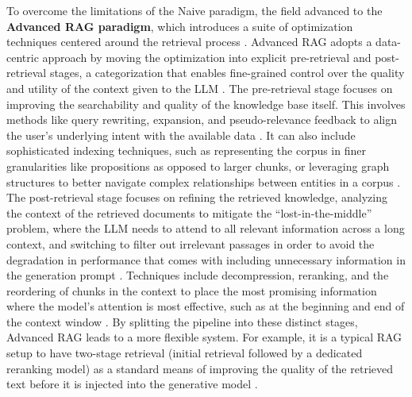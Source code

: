 \documentclass[11pt]{article}
\begin{document}
To overcome the limitations of the Naive paradigm, the field advanced to the \textbf{Advanced RAG paradigm}, which introduces a suite of optimization techniques centered around the retrieval process \cite{ref23,ref38}. Advanced RAG adopts a data-centric approach by moving the optimization into explicit pre-retrieval and post-retrieval stages, a categorization that enables fine-grained control over the quality and utility of the context given to the LLM \cite{ref23}. The pre-retrieval stage focuses on improving the searchability and quality of the knowledge base itself. This involves methods like query rewriting, expansion, and pseudo-relevance feedback to align the user's underlying intent with the available data \cite{ref29}. It can also include sophisticated indexing techniques, such as representing the corpus in finer granularities like propositions as opposed to larger chunks, or leveraging graph structures to better navigate complex relationships between entities in a corpus \cite{ref52,ref23}. The post-retrieval stage focuses on refining the retrieved knowledge, analyzing the context of the retrieved documents to mitigate the ``lost-in-the-middle'' problem, where the LLM needs to attend to all relevant information across a long context, and switching to filter out irrelevant passages in order to avoid the degradation in performance that comes with including unnecessary information in the generation prompt \cite{ref27,ref23}. Techniques include decompression, reranking, and the reordering of chunks in the context to place the most promising information where the model's attention is most effective, such as at the beginning and end of the context window \cite{ref23}. By splitting the pipeline into these distinct stages, Advanced RAG leads to a more flexible system. For example, it is a typical RAG setup to have two-stage retrieval (initial retrieval followed by a dedicated reranking model) as a standard means of improving the quality of the retrieved text before it is injected into the generative model \cite{ref53}.
\end{document}
